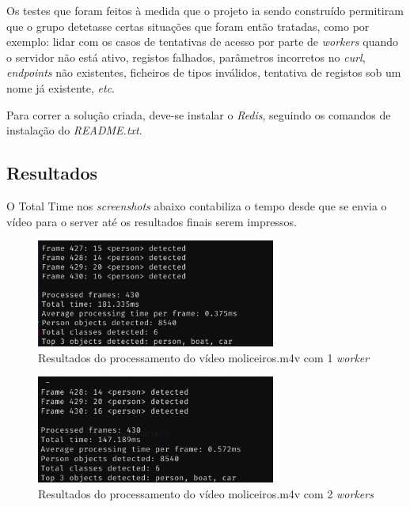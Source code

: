 \documentclass[10pt,portuguese]{article}
\begin{document}
\par Os testes que foram feitos à medida que o projeto ia sendo construído permitiram que o grupo detetasse certas situações que foram então tratadas, como por exemplo: lidar com os casos de tentativas de acesso por parte de \textit{workers} quando o servidor não está ativo, registos falhados, parâmetros incorretos no \textit{curl}, \textit{endpoints} não existentes, ficheiros de tipos inválidos, tentativa de registos sob um nome já existente, \textit{etc}.
\par Para correr a solução criada, deve-se instalar o \textit{Redis}, seguindo os comandos de instalação do \textit{README.txt}.
\subsection{Resultados}
\par O Total Time nos \textit{screenshots} abaixo contabiliza o tempo desde que se envia o vídeo para o server até os resultados finais serem impressos. 
    \begin{figure}[!h]
        \centering
        \includegraphics[width=0.7\textwidth]{1worker.png}
        \caption{Resultados do processamento do vídeo moliceiros.m4v com 1 \textit{worker}} 
    \end{figure}
    
    \begin{figure}[!h]
        \centering
        \includegraphics[width=0.7\textwidth]{2workers.png}
        \caption{Resultados do processamento do vídeo moliceiros.m4v com 2 \textit{workers}} 
    \end{figure}
    
\end{document}

